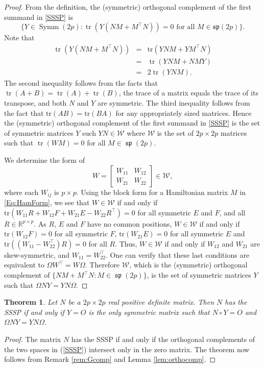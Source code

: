 \documentclass[12pt]{article}
\newtheorem{thm}{Theorem}[section]
\theoremstyle{definition}
\theoremstyle{definition}
\theoremstyle{definition}
\numberwithin{figure}{section}
\numberwithin{equation}{section}
\newcommand{\R}{\mathbb{R}}
\newcommand{\symm}{\operatorname{Symm}}
\newcommand{\spLA}{\operatorname{\mathfrak{sp}}}
\newcommand{\trans}{^{\top}}
\newcommand{\tr}{\operatorname{tr}}
\newcommand{\x}{\times}
\newcommand{\bpf}{\begin{proof}}
\newcommand{\epf}{\end{proof}\ms}
\newcommand{\ms}{\medskip}
\begin{document}
\bpf 
From the definition, the (symmetric) orthogonal complement of  the first summand in
\eqref{SSSP} is 
\[ 
\{ Y \in \symm(2p)\colon
\tr(Y(NM+M\trans N))=0 
\mbox{ for all $M \in \mathfrak{sp}(2p)$} \}.
\]
Note that 
\begin{eqnarray*}
\tr(Y(NM + M\trans N)) &= & \mbox{tr}(YNM + YM\trans N) \\
& = & \tr(YNM + NMY)\\
& = & 2\tr(YNM).  
\end{eqnarray*}
The second inequality follows from the facts that { $\tr(A+B)=\tr(A)+\tr(B)$,} the trace of a matrix {equals the trace of} its transpose, and  both  $N$ and $Y$ are symmetric. 
The third inequality follows from the fact that 
$\mbox{tr}(AB)= \mbox{tr}(BA)$ for any appropriately sized matrices. 
Hence the {(symmetric)} orthogonal complement of 
the first summand in \eqref{SSSP}
is the set of symmetric matrices $Y$ such 
$YN \in \mathcal{W}$ {where $\mathcal{W}$ is the set of $2p\times 2p$
matrices such that $\tr(WM)=0$ for all $M \in \spLA (2p)$}.  


We  determine  the form of
\[
W= \begin{bmatrix}
    W_{11} & W_{12} \\
    W_{21} & W_{22}
\end{bmatrix}\in \mathcal{W},
\] where each $W_{ij}$ is $p\times p$.
Using the block form for a Hamiltonian matrix $M$ in \eqref{Eq:HamForm}, we see that $W\in \mathcal{W}$ if and only if 
$
\mbox{tr} (W_{11}R  + W_{12}F + 
W_{21}E-W_{22}R^\top)=0 $ for all symmetric  $E$ and $F$, and all $R\in\R^{p\x p}$. As $R$, $E$ and $F$ have no common positions, 
 $W \in \mathcal{W}$ if and only 
if $\mbox{tr}(W_{12}F)=0$ for all symmetric $F$, 
$\mbox{tr}(W_{21}E)=0$ for all symmetric $E$ and 
$\mbox{tr}((W_{11} - W_{22}^\top)R)=0$ for all $R$.
Thus, $W \in \mathcal{W}$ if and only if $W_{12}$ 
and $W_{21}$ are skew-symmetric, and  $W_{11}=W_{22}^\top$. 
One can verify that these  last conditions are equivalent to 
$ \Omega W^\top= W\Omega$. Therefore $\mathcal{W}$, which is the (symmetric) orthogonal complement of $ \{ NM+ M\trans N\colon M \in \spLA(2p) \}$,  is the set of symmetric matrices $Y$ such that
$\Omega N Y= YN \Omega$.
\epf



\begin{thm}
\label{SSSPequiv}
Let $N$ be a $2p\times 2p$ real positive definite matrix.
Then  $N$ has the SSSP if and only if $Y=O$ is the only symmetric matrix such that $N \circ Y=O$ and $ \Omega NY=YN\Omega$.
\end{thm}
\begin{proof}
The matrix $N$ has the  SSSP if and only if 
the orthogonal complements of the  two spaces in (\ref{SSSP}) intersect only in the zero matrix.  The theorem now follows from Remark \ref{rem:Gcomp} and Lemma \ref{lem:orthocomp}.
\end{proof}  
\end{document}

